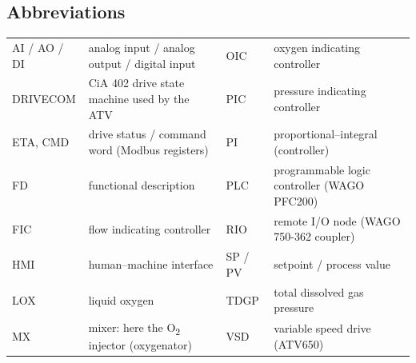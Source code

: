 \documentclass[11pt,a4paper]{article}
\newcommand{\Otwo}{O\textsubscript{2}}
\begin{document}
\subsection{Abbreviations}
\begin{small}
\begin{tabularx}{\textwidth}{@{}P{22mm}L P{22mm}L@{}}
\toprule
AI / AO / DI & analog input / analog output / digital input & OIC & oxygen indicating controller \\
DRIVECOM & CiA 402 drive state machine used by the ATV & PIC & pressure indicating controller \\
ETA, CMD & drive status / command word (Modbus registers) & PI & proportional--integral (controller) \\
FD & functional description & PLC & programmable logic controller (WAGO PFC200) \\
FIC & flow indicating controller & RIO & remote I/O node (WAGO 750-362 coupler) \\
HMI & human--machine interface & SP / PV & setpoint / process value \\
LOX & liquid oxygen & TDGP & total dissolved gas pressure \\
MX & mixer: here the \Otwo{} injector (oxygenator) & VSD & variable speed drive (ATV650) \\
\bottomrule
\end{tabularx}
\end{small}
\end{document}
